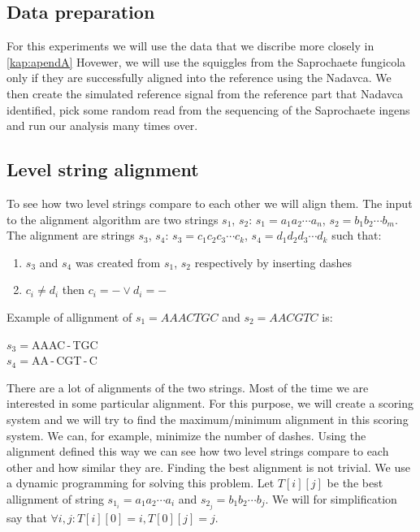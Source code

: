 \subsection{Data preparation}

For this experiments we will use the data that we discribe more closely in \ref{kap:apendA}
Hovewer, we will use the squiggles from the Saprochaete fungicola only if they
are successfully aligned into the reference using the Nadavca. We then create the
simulated reference signal from the reference part that Nadavca identified, pick
some random read from the sequencing of the Saprochaete ingens and run our analysis
many times over.

\subsection{Level string alignment}

To see how two level strings compare to each other we will align them. The input
to the alignment algorithm are two strings $s_1$, $s_2$:
$s_1=a_1a_2\cdots a_n$, $s_2=b_1b_2\cdots b_m$. The alignment are strings
$s_3$, $s_4$: $s_3 = c_1c_2c_3\cdots c_k$, $s_4 = d_1d_2d_3\cdots d_k$
such that:

\begin{enumerate}
\item $s_3$ and $s_4$ was created from $s_1$, $s_2$ respectively by inserting dashes
\item $c_i \neq d_i$ then $c_i = - \lor d_i = -$
\end{enumerate}

Example of allignment of $s_1 = AAACTGC$ and $s_2 = AACGTC$ is:

\begin{center}
$s_3 = $AAAC\,-\,TGC\\
$s_4 = $AA\,-\,CGT\,-\,C
\end{center}

There are a lot of alignments of the two strings. Most of the time we
are interested in some particular alignment. For this purpose, we will create a
scoring system and we will try to find the maximum/minimum alignment in this scoring
system. We can, for example, minimize the number of dashes. Using the alignment
defined this way we can see how two level strings compare to each other and how similar they are.
Finding the best alignment is not trivial. We use a dynamic programming for
solving this problem. Let $T[i][j]$ be the best allignment of string $s_{1_i} = a_1a_2\cdots a_i$
and $s_{2_j} = b_1b_2\cdots b_j$. We will for simplification say that $\forall i, j: T[i][0] = i, T[0][j] = j$.

